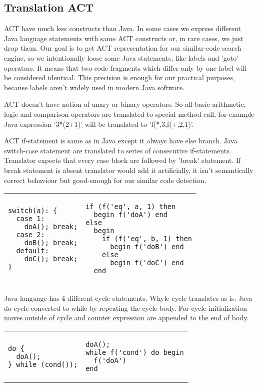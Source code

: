 \subsection{Translation ACT}

ACT have much less constructs than Java. 
In some cases we express different Java language statements with same ACT constructs or, in rare cases, we just drop
them.
Our goal is to get ACT representation for our similar-code search engine, so we intentionally loose some Java
statements, like labels and 'goto' operators.
It means that two code fragments which differ only by one label will be considered identical.
This precision is enough for our practical purposes, because labels aren't widely used in modern Java software.

ACT doesn't have notion of unary or binary operators. 
So all basic arithmetic, logic and comparison operators are translated to special method call, for example Java
expression '3*(2+1)' will be translated to 'f(*,3,f(+,2,1)'.

ACT if-statement is same as in Java except it always have else branch.
Java switch-case statement are translated to series of consecutive if-statements.
Translator expects that every case block are followed by 'break' statement.
If break statement is absent translator would add it artificially, it isn't semantically correct behaviour but
good-enough for our similar code detection.

\begin{tabular}{ p{6cm} p{6cm} }
\begin{verbatim}
switch(a): {
  case 1:
  	doA(); break;
  case 2:
    doB(); break;
  default:
  	doC(); break;
}
\end{verbatim} 
  &
\begin{verbatim}
if (f('eq', a, 1) then 
  begin f('doA') end
else 
  begin
    if (f('eq', b, 1) then
      begin f('doB') end 
    else
      begin f('doC') end
  end
\end{verbatim}
\end{tabular}

Java language has 4 different cycle statements. Whyle-cycle translates as is. Java do-cycle converted to
while by repeating the cycle body. For-cycle initialization moves outside of cycle and counter expression are
appended to the end of body.

\begin{tabular}{ p{6cm} p{6cm} }
\begin{verbatim}
do {
  doA();
} while (cond());
\end{verbatim} 
  & 
\begin{verbatim}
doA();
while f('cond') do begin
  f('doA')
end
\end{verbatim}
\end{tabular}


